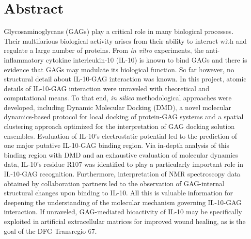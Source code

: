 \chapter{Abstract}
Glycosaminoglycans (GAGs) play a critical role in many biological processes.
Their multifarious biological activity arises from their ability to interact
with and regulate a large number of proteins. From \textit{in vitro}
experiments, the anti-inflammatory cytokine interleukin-10 (IL-10) is known to
bind GAGs and there is evidence that GAGs may modulate its biological function.
So far however, no structural detail about IL-10-GAG interaction was known. In
this project, atomic details of IL-10-GAG interaction were unraveled with
theoretical and computational means. To that end, \textit{in silico}
methodological approaches were developed, including Dynamic Molecular Docking
(DMD), a novel molecular dynamics-based protocol for local docking of
protein-GAG systems and a spatial clustering approach optimized for the
interpretation of GAG docking solution ensembles. Evaluation of IL-10's
electrostatic potential led to the prediction of one major putative IL-10-GAG
binding region. Via in-depth analysis of this binding region with DMD and an
exhaustive evaluation of molecular dynamics data, IL-10's residue R107 was
identified to play a particularly important role in IL-10-GAG recognition.
Furthermore, interpretation of NMR spectroscopy data obtained by collaboration
partners led to the observation of GAG-internal structural changes upon binding
to IL-10. All this is valuable information for deepening the understanding of
the molecular mechanism governing IL-10-GAG interaction. If unraveled,
GAG-mediated bioactivity of IL-10 may be specifically exploited in artificial
extracellular matrices for improved wound healing, as is the goal of the DFG
Transregio 67.